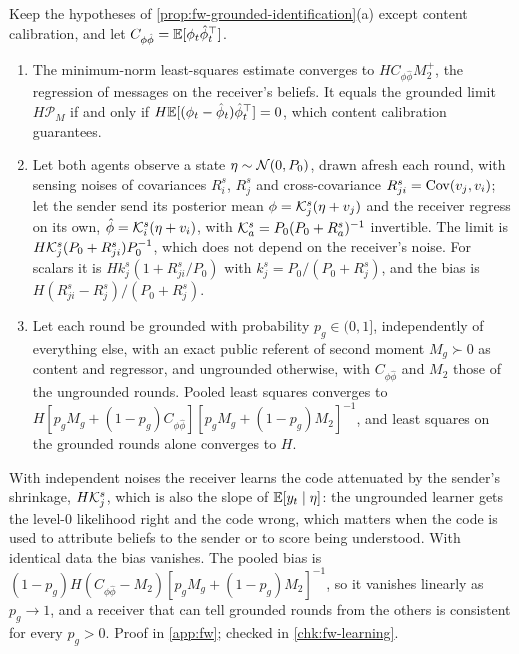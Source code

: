 \begin{proposition}\label{prop:fw-ungrounded-bias}
Keep the hypotheses of \cref{prop:fw-grounded-identification}(a) except content calibration, and let $C_{\phi\hat\phi}=\mathbb{E}[\phi_t\hat\phi_t^\top]$.
\begin{enumerate}
\item[(a)] The minimum-norm least-squares estimate converges to $HC_{\phi\hat\phi}M_2^+$, the regression of messages on the receiver's beliefs. It equals the grounded limit $H\mathcal P_M$ if and only if $H\mathbb{E}[(\phi_t-\hat\phi_t)\hat\phi_t^\top]=0$, which content calibration guarantees.
\item[(b)] Let both agents observe a state $\eta\sim\mathcal{N}(0,P_0)$, drawn afresh each round, with sensing noises of covariances $R^s_i$, $R^s_j$ and cross-covariance $R^s_{ji}=\operatorname{Cov}(v_j,v_i)$; let the sender send its posterior mean $\phi=\mathcal{K}^s_j(\eta+v_j)$ and the receiver regress on its own, $\hat\phi=\mathcal{K}^s_i(\eta+v_i)$, with $\mathcal{K}^s_a=P_0(P_0+R^s_a)^{-1}$ invertible. The limit is $H\mathcal{K}^s_j(P_0+R^s_{ji})P_0^{-1}$, which does not depend on the receiver's noise. For scalars it is $Hk^s_j(1+R^s_{ji}/P_0)$ with $k^s_j=P_0/(P_0+R^s_j)$, and the bias is $H(R^s_{ji}-R^s_j)/(P_0+R^s_j)$.
\item[(c)] Let each round be grounded with probability $p_g\in(0,1]$, independently of everything else, with an exact public referent of second moment $M_g\succ0$ as content and regressor, and ungrounded otherwise, with $C_{\phi\hat\phi}$ and $M_2$ those of the ungrounded rounds. Pooled least squares converges to $H[p_gM_g+(1-p_g)C_{\phi\hat\phi}][p_gM_g+(1-p_g)M_2]^{-1}$, and least squares on the grounded rounds alone converges to $H$.
\end{enumerate}
\end{proposition}

With independent noises the receiver learns the code attenuated by the sender's shrinkage, $H\mathcal{K}^s_j$, which is also the slope of $\mathbb{E}[y_t\mid\eta]$: the ungrounded learner gets the level-0 likelihood right and the code wrong, which matters when the code is used to attribute beliefs to the sender or to score being understood. With identical data the bias vanishes. The pooled bias is $(1-p_g)H(C_{\phi\hat\phi}-M_2)[p_gM_g+(1-p_g)M_2]^{-1}$, so it vanishes linearly as $p_g\to1$, and a receiver that can tell grounded rounds from the others is consistent for every $p_g>0$. Proof in \cref{app:fw}; checked in \cref{chk:fw-learning}.

